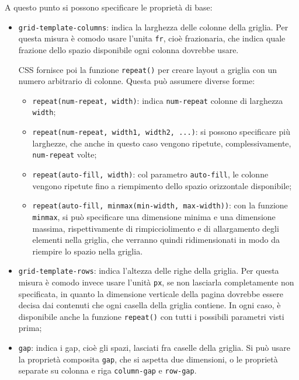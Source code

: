 \documentclass[a4paper,11pt]{article}
\begin{document}
A questo punto si possono specificare le proprietà di base:
\begin{itemize}
	\item \lstinline|grid-template-columns|: indica la larghezza delle colonne della griglia.
		Per questa misura è comodo usare l'unita \lstinline|fr|, cioè frazionaria, che indica quale frazione dello spazio disponibile ogni colonna dovrebbe usare.

		CSS fornisce poi la funzione \lstinline|repeat()| per creare layout a griglia con un numero arbitrario di colonne.
		Questa può assumere diverse forme:
		\begin{itemize}
			\item \lstinline|repeat(num-repeat, width)|: indica \lstinline|num-repeat| colonne di larghezza \lstinline|width|;
			\item \lstinline|repeat(num-repeat, width1, width2, ...)|: si possono specificare più larghezze, che anche in questo caso vengono ripetute, complessivamente, \lstinline|num-repeat| volte;
			\item \lstinline|repeat(auto-fill, width)|: col parametro \lstinline|auto-fill|, le colonne vengono ripetute fino a riempimento dello spazio orizzontale disponibile;
			\item \lstinline|repeat(auto-fill, minmax(min-width, max-width))|: con la funzione \lstinline|minmax|, si può specificare una dimensione minima e una dimensione massima, rispettivamente di rimpicciolimento e di allargamento degli elementi nella griglia, che verranno quindi ridimensionati in modo da riempire lo spazio nella griglia.
		\end{itemize}

	\item \lstinline|grid-template-rows|: indica l'altezza delle righe della griglia.
		Per questa misura è comodo invece usare l'unità \lstinline|px|, se non lasciarla completamente non specificata, in quanto la dimensione verticale della pagina dovrebbe essere decisa dai contenuti che ogni casella della griglia contiene.
		In ogni caso, è disponibile anche la funzione \lstinline|repeat()| con tutti i possibili parametri visti prima;

	\item \lstinline|gap|: indica i gap, cioè gli spazi, lasciati fra caselle della griglia. Si può usare la proprietà composita \lstinline|gap|, che si aspetta due dimensioni, o le proprietà separate su colonna e riga \lstinline|column-gap| e \lstinline|row-gap|.
\end{itemize}
\end{document}
